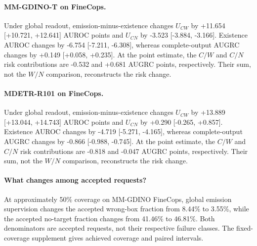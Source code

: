\paragraph{MM-GDINO-T on FineCops.} Under global readout, emission-minus-existence changes $U_{CW}$ by +11.654 [+10.721, +12.641] AUROC points and $U_{CN}$ by -3.523 [-3.884, -3.166]. Existence AUROC changes by -6.754 [-7.211, -6.308], whereas complete-output AUGRC changes by +0.149 [+0.058, +0.235]. At the point estimate, the $C/W$ and $C/N$ risk contributions are -0.532 and +0.681 AUGRC points, respectively. Their sum, not the $W/N$ comparison, reconstructs the risk change.

\paragraph{MDETR-R101 on FineCops.} Under global readout, emission-minus-existence changes $U_{CW}$ by +13.889 [+13.044, +14.743] AUROC points and $U_{CN}$ by +0.290 [-0.265, +0.857]. Existence AUROC changes by -4.719 [-5.271, -4.165], whereas complete-output AUGRC changes by -0.866 [-0.988, -0.745]. At the point estimate, the $C/W$ and $C/N$ risk contributions are -0.818 and -0.047 AUGRC points, respectively. Their sum, not the $W/N$ comparison, reconstructs the risk change.

\paragraph{What changes among accepted requests?} At approximately 50\% coverage on MM-GDINO FineCops, global emission supervision changes the accepted wrong-box fraction from 8.44\% to 3.55\%, while the accepted no-target fraction changes from 41.46\% to 46.81\%. Both denominators are accepted requests, not their respective failure classes. The fixed-coverage supplement gives achieved coverage and paired intervals.
